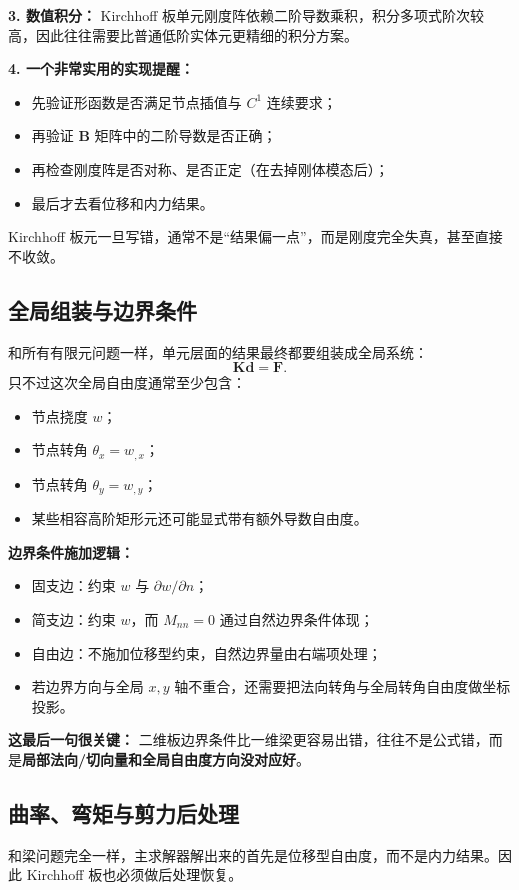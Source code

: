 \documentclass[11pt, a4paper, UTF8]{ctexart}
\begin{document}
\textbf{3. 数值积分：}
Kirchhoff 板单元刚度阵依赖二阶导数乘积，积分多项式阶次较高，因此往往需要比普通低阶实体元更精细的积分方案。

\textbf{4. 一个非常实用的实现提醒：}
\begin{itemize}
    \item 先验证形函数是否满足节点插值与 $C^1$ 连续要求；
    \item 再验证 $\bm{B}$ 矩阵中的二阶导数是否正确；
    \item 再检查刚度阵是否对称、是否正定（在去掉刚体模态后）；
    \item 最后才去看位移和内力结果。
\end{itemize}
Kirchhoff 板元一旦写错，通常不是“结果偏一点”，而是刚度完全失真，甚至直接不收敛。

\subsection{全局组装与边界条件}
和所有有限元问题一样，单元层面的结果最终都要组装成全局系统：
\[
\bm{K}\bm{d} = \bm{F}.
\]
只不过这次全局自由度通常至少包含：
\begin{itemize}
    \item 节点挠度 $w$；
    \item 节点转角 $\theta_x = w_{,x}$；
    \item 节点转角 $\theta_y = w_{,y}$；
    \item 某些相容高阶矩形元还可能显式带有额外导数自由度。
\end{itemize}

\textbf{边界条件施加逻辑：}
\begin{itemize}
    \item 固支边：约束 $w$ 与 $\partial w/\partial n$；
    \item 简支边：约束 $w$，而 $M_{nn}=0$ 通过自然边界条件体现；
    \item 自由边：不施加位移型约束，自然边界量由右端项处理；
    \item 若边界方向与全局 $x,y$ 轴不重合，还需要把法向转角与全局转角自由度做坐标投影。
\end{itemize}

\textbf{这最后一句很关键：}
二维板边界条件比一维梁更容易出错，往往不是公式错，而是\textbf{局部法向/切向量和全局自由度方向没对应好}。

\subsection{曲率、弯矩与剪力后处理}
和梁问题完全一样，主求解器解出来的首先是位移型自由度，而不是内力结果。因此 Kirchhoff 板也必须做后处理恢复。
\end{document}
